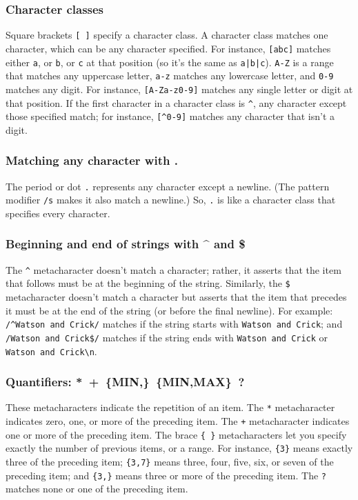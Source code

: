 \subsubsection{Character classes}
Square brackets \verb|[ ]| specify a character class. A character class matches one character, which can be any character specified. For instance, \verb|[abc]| matches either \verb|a|, or \verb|b|, or \verb|c| at that position (so it's the same as \verb=a|b|c=). \verb|A-Z| is a range that matches any uppercase letter, \verb|a-z| matches any lowercase letter, and \verb|0-9| matches any digit. For instance, \verb|[A-Za-z0-9]| matches any single letter or digit at that position. If the first character in a character class is \verb|^|, any character except those specified match; for instance, \verb|[^0-9]| matches any character that isn't a digit.

\subsubsection{Matching any character with .}
The period or dot \verb|.| represents any character except a newline. (The pattern modifier \verb|/s| makes it also match a newline.) So, \verb|.| is like a character class that specifies every character.

\subsubsection{Beginning and end of strings with \^{} and \$}
The \verb|^| metacharacter doesn't match a character; rather, it asserts that the item that follows must be at the beginning of the string. Similarly, the \verb|$| metacharacter doesn't match a character but asserts that the item that precedes it must be at the end of the string (or before the final newline). For example: \verb|/^Watson and Crick/| matches if the string starts with \verb|Watson and Crick|; and \verb|/Watson and Crick$/| matches if the string ends with \verb|Watson and Crick| or \verb|Watson and Crick\n|.

\subsubsection{Quantifiers: *\ +\ \{MIN,\}\ \{MIN,MAX\}\ ?}
These metacharacters indicate the repetition of an item. The \verb|*| metacharacter indicates zero, one, or more of the preceding item. The \verb|+| metacharacter indicates one or more of the preceding item. The brace \verb|{ }| metacharacters let you specify exactly the number of previous items, or a range. For instance, \verb|{3}| means exactly three of the preceding item; \verb|{3,7}| means three, four, five, six, or seven of the preceding item; and \verb|{3,}| means three or more of the preceding item. The \verb|?| matches none or one of the preceding item.

